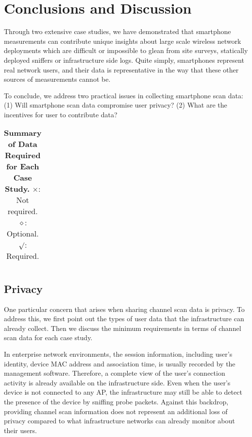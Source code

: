 \section{Conclusions and Discussion}
\label{sec:conclusion}

Through two extensive case studies, we have demonstrated that smartphone
measurements can contribute unique insights about large scale wireless network
deployments which are difficult or impossible to glean from site surveys,
statically deployed sniffers or infrastructure side logs. Quite simply,
smartphones represent real network users, and their data is representative in
the way that these other sources of measurements cannot be.

To conclude, we address two practical issues in collecting smartphone
scan data: (1) Will smartphone scan data compromise user privacy? (2) What
are the incentives for user to contribute data? 

\begin{table*}[t!]
  \centering
  \begin{tabular}{cccccccc}
    
  \end{tabular}
  \caption{\textbf{Summary of Data Required for Each Case Study.} $\times$: Not
  required. $\diamond$: Optional. $\surd$: Required.}
  \label{tab:privacy}
  \vspace*{\aftercaptiongap}
\end{table*}

\subsection{Privacy}
\label{subsec:privacy}

One particular concern that arises when sharing channel scan data is privacy.
To address this, we first point out the types of user data that the
infrastructure can already collect. Then we discuss the minimum
requirements in terms of channel scan data for each case study.

In enterprise network environments, the \wifi{} session information,
including user's identity, device MAC address and association time, is usually
recorded by the management software. Therefore, a complete view of the user's
\wifi{} connection activity is already available on the infrastructure side.
Even when the user's device is not connected to any AP, the infrastructure
may still be able to detect the presence of the device by sniffing probe
packets. Against this backdrop,
providing channel scan information does not represent an additional loss of
privacy compared to what infrastructure networks can already monitor about
their users.

